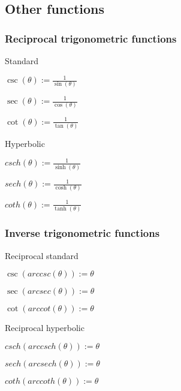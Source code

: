 
\subsection{Other functions}

\subsubsection{Reciprocal trigonometric functions}

Standard

$\csc (\theta ):=\frac{1}{\sin (\theta )}$

$\sec (\theta ):=\frac{1}{\cos (\theta )}$

$\cot (\theta ):=\frac{1}{\tan (\theta )}$

Hyperbolic

$csch (\theta ):=\frac{1}{\sinh (\theta )}$

$sech (\theta ):=\frac{1}{\cosh (\theta )}$

$coth (\theta ):=\frac{1}{\tanh (\theta )}$

\subsubsection{Inverse trigonometric functions}

Reciprocal standard

$\csc (arccsc (\theta )):=\theta $

$\sec (arcsec (\theta )):=\theta $

$\cot (arccot (\theta )):=\theta $

Reciprocal hyperbolic

$csch (arccsch (\theta )):=\theta $

$sech (arcsech (\theta )):=\theta $

$coth (arccoth (\theta )):=\theta $

